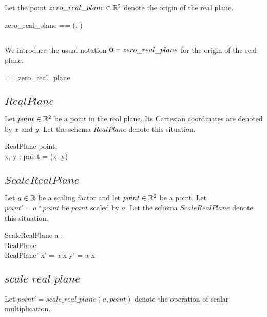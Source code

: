 \documentclass[11pt, oneside]{article}
\begin{document}
Let the point $zero\_real\_plane \in \mathbb{R}^2$ denote the origin of the real plane.

\begin{zed}
	zero\_real\_plane == (\zeroR, \zeroR)
\end{zed}

\subsection{}

We introduce the usual notation $\mathbf{0} = zero\_real\_plane$ for the origin of the real plane.

\begin{zed}
	\zeroRtwo == zero\_real\_plane
\end{zed}

\subsection{$RealPlane$}

Let $point \in \mathbb{R}^2$ be a point in the real plane.
Its Cartesian coordinates are denoted by $x$ and $y$.
Let the schema $RealPlane$ denote this situation.

\begin{schema}{RealPlane}
	point: \Rtwo \\
	x, y : \R
\where
	point = (x, y)
\end{schema}

\subsection{$ScaleRealPlane$}

Let $a \in \mathbb{R}$ be a scaling factor and let $point \in \mathbb{R}^2$ be a point.
Let $point' = a * point$ be  $point$ scaled by $a$.
Let the schema $ScaleRealPlane$ denote this situation.

\begin{schema}{ScaleRealPlane}
	a : \R \\
	RealPlane \\
	RealPlane'
\where
	x' = a \mulR x
\also
	y' = a \mulR x
\end{schema}

\subsection{$scale\_real\_plane$}

Let $point' = scale\_real\_plane(a, point)$ denote the operation of scalar multiplication.
\end{document}
